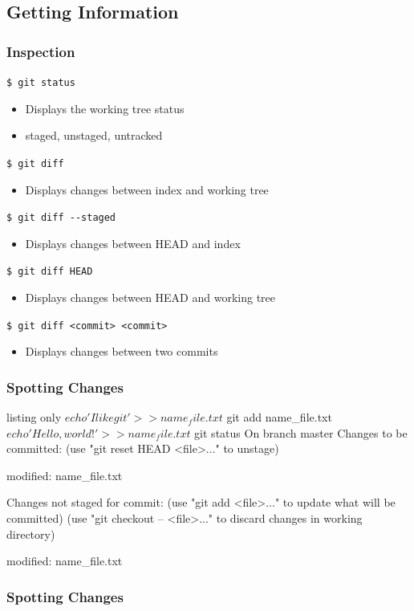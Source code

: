 \documentclass[english,compress]{beamer}
\begin{document}
\subsection{Getting Information}
\begin{frame}[fragile]
    \frametitle{Inspection}

    \verb|$ git status|
    \begin{itemize}
        \item Displays the working tree status
        \item staged, unstaged, untracked
    \end{itemize}
    \verb|$ git diff|
    \begin{itemize}
        \item Displays changes between index and working tree
    \end{itemize}
    \verb|$ git diff --staged|
    \begin{itemize}
        \item Displays changes between HEAD and index
    \end{itemize}
    \verb|$ git diff HEAD|
    \begin{itemize}
        \item Displays changes between HEAD and working tree
    \end{itemize}
    \verb|$ git diff <commit> <commit>|
    \begin{itemize}
        \item Displays changes between two commits
    \end{itemize}
\end{frame}

\begin{frame}[fragile]
    \frametitle{Spotting Changes}
    \begin{tcblisting}{listing only}
$ echo 'I like git' >> name_file.txt
$ git add name_file.txt
$ echo 'Hello, world!' >> name_file.txt
$ git status
On branch master
Changes to be committed:
  (use "git reset HEAD <file>..." to unstage)

	modified:   name_file.txt

Changes not staged for commit:
  (use "git add <file>..." to update what will be committed)
  (use "git checkout -- <file>..." to discard changes in working directory)

	modified:   name_file.txt
    \end{tcblisting}
\end{frame}

\begin{frame}[fragile]
    \frametitle{Spotting Changes}
\end{frame}
\end{document}
